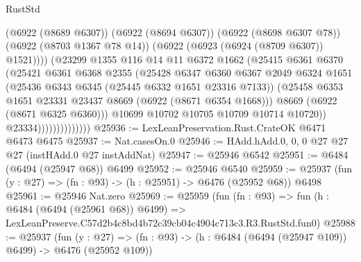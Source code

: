 \begin{lexlean}{RustStd}
\begin{coremodule}
                                  (@6922 (@8689 @6307))
                                  (@6922 (@8694 @6307))
                                  (@6922 (@8698 @6307 @78))
                                  (@6922 (@8703 @1367 @78 @14))
                                  (@6922 (@6923 (@6924 (@8709 @6307)) @1521))))
                              (@23299
                                @1355
                                @116
                                @14
                                @11
                                @6372
                                @1662
                                (@25415
                                  @6361
                                  @6370
                                  (@25421
                                    @6361
                                    @6368
                                    @2355
                                    (@25428
                                      @6347
                                      @6360
                                      @6367
                                      @2049
                                      @6324
                                      @1651
                                      (@25436 @6343 @6345 (@25445 @6332 @1651 @23316 @7133))
                                      (@25458
                                        @6353
                                        @1651
                                        @23331
                                        @23437
                                        @8669
                                        (@6922 (@8671 @6354 @1668)))
                                      @8669
                                      (@6922 (@8671 @6325 @6360)))
                                    @10699
                                    @10702
                                    @10705
                                    @10709
                                    @10714
                                    @10720))
                                @23334))))))))))))))
@25936 := LexLeanPreservation.Rust.CrateOK @6471 @6473 @6475
@25937 := Nat.casesOn.{0}
@25946 := HAdd.hAdd.{0, 0, 0} @27 @27 @27 (instHAdd.{0} @27 instAddNat)
@25947 := @25946 @6542
@25951 := @6484 (@6494 (@25947 @68)) @6499
@25952 := @25946 @6540
@25959 := @25937 (fun (y : @27) => (fn : @93) -> (h : @25951) -> @6476 (@25952 @68)) @6498
@25961 := @25946 Nat.zero
@25969 := @25959
    (fun (fn : @93) =>
    fun (h : @6484 (@6494 (@25961 @68)) @6499) =>
    LexLeanPreserve.C57d2b4c8bd4b72c39cb04c4904c713c3.R3.RustStd.fun0)
@25988 := @25937
    (fun (y : @27) => (fn : @93) -> (h : @6484 (@6494 (@25947 @109)) @6499) -> @6476 (@25952 @109))

\end{coremodule}
\end{lexlean}
